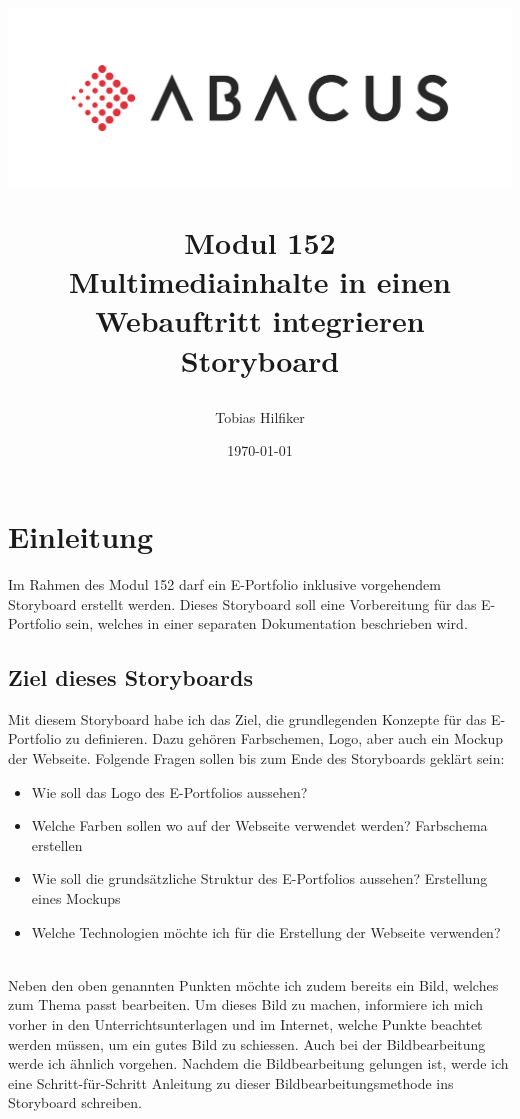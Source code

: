 \documentclass[11pt]{article}
\title{
    \includegraphics{media/frontpage}
    \begin{center}
        Modul 152 \\
        Multimediainhalte in einen Webauftritt integrieren\\
        Storyboard
    \end{center}}
\author{Tobias Hilfiker}
\date{\today}
\begin{document}
    \begin{titlingpage}
        \maketitle
    \end{titlingpage}
    \pagebreak

    \tableofcontents
    \pagebreak

    \section{Einleitung}
    Im Rahmen des Modul 152 darf ein E-Portfolio inklusive vorgehendem Storyboard erstellt werden.
    Dieses Storyboard soll eine Vorbereitung für das E-Portfolio sein, welches in einer separaten
    Dokumentation beschrieben wird.

    \subsection{Ziel dieses Storyboards}
    Mit diesem Storyboard habe ich das Ziel, die grundlegenden Konzepte für das E-Portfolio zu definieren.
    Dazu gehören Farbschemen, Logo, aber auch ein Mockup der Webseite.
    Folgende Fragen sollen bis zum Ende des Storyboards geklärt sein:
    \begin{itemize}
        \item Wie soll das Logo des E-Portfolios aussehen?
        \item Welche Farben sollen wo auf der Webseite verwendet werden? \textrightarrow Farbschema erstellen
        \item Wie soll die grundsätzliche Struktur des E-Portfolios aussehen?
        \textrightarrow Erstellung eines Mockups
        \item Welche Technologien möchte ich für die Erstellung der Webseite verwenden?
    \end{itemize}
    \\
    Neben den oben genannten Punkten möchte ich zudem bereits ein Bild, welches zum Thema passt bearbeiten.
    Um dieses Bild zu machen, informiere ich mich vorher in den Unterrichtsunterlagen und im Internet, welche
    Punkte beachtet werden müssen, um ein gutes Bild zu schiessen.
    Auch bei der Bildbearbeitung werde ich ähnlich vorgehen. Nachdem die Bildbearbeitung gelungen ist, werde
    ich eine Schritt-für-Schritt Anleitung zu dieser Bildbearbeitungsmethode ins Storyboard schreiben.
\end{document}
